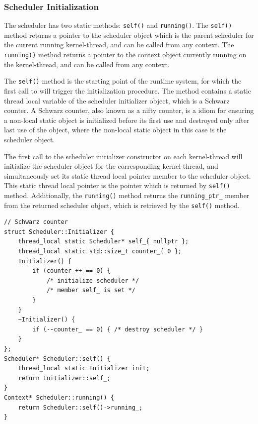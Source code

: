 \subsubsection{Scheduler Initialization}


The scheduler has two static methods: \lstinline[style={CustomC++}]|self()| and \lstinline[style={CustomC++}]|running()|. The \lstinline[style={CustomC++}]|self()| method returns a pointer to the scheduler object which is the parent scheduler for the current running kernel\hyp{}thread, and can be called from any context. The \lstinline[style={CustomC++}]|running()| method returns a pointer to the context object currently running on the kernel\hyp{}thread, and can be called from any context.

The \lstinline[style={CustomC++}]|self()| method is the starting point of the runtime system, for which the first call to will trigger the initialization procedure. The method contains a static thread local variable of the scheduler initializer object, which is a Schwarz counter. A Schwarz counter, also known as a nifty counter, is a \Cpp{} idiom for ensuring a non\hyp{}local static object is initialized before its first use and destroyed only after last use of the object, where the non\hyp{}local static object in this case is the scheduler object. 

The first call to the scheduler initializer constructor on each kernel\hyp{}thread will initialize the scheduler object for the corresponding kernel\hyp{}thread, and simultaneously set its static thread local pointer member to the scheduler object. This static thread local pointer is the pointer which is returned by \lstinline[style={CustomC++}]|self()| method. Additionally, the \lstinline[style={CustomC++}]|running()| method returns the \lstinline[style={CustomC++}]|running_ptr_| member from the returned scheduler object, which is retrieved by the \lstinline[style={CustomC++}]|self()| method.

\begin{lstfloat}
\begin{lstlisting}[caption={Static scheduler methods.}, label={lst:static_scheduler_methods}, style={CustomC++}, xleftmargin={2em}]
// Schwarz counter
struct Scheduler::Initializer {
    thread_local static Scheduler* self_{ nullptr };
    thread_local static std::size_t counter_{ 0 };
    Initializer() {
        if (counter_++ == 0) { 
            /* initialize scheduler */ 
            /* member self_ is set */
        }
    }
    ~Initializer() {
        if (--counter_ == 0) { /* destroy scheduler */ }
    }
};
Scheduler* Scheduler::self() {
    thread_local static Initializer init;
    return Initializer::self_;
}
Context* Scheduler::running() {
    return Scheduler::self()->running_;
}
\end{lstlisting}
\end{lstfloat}


